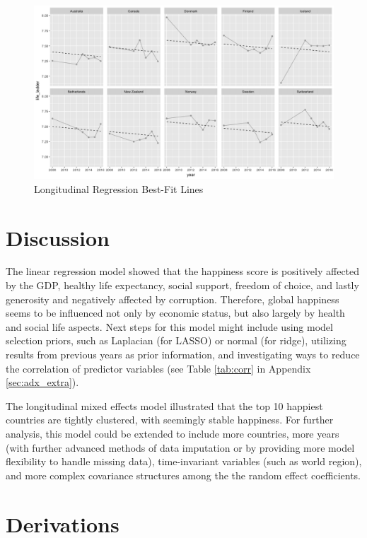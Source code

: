 \documentclass{article}
\begin{document}
\begin{figure}[h!]
\centering
\includegraphics[scale=.45]{each_long_fit.png}
\caption{\label{fig:each_long}Longitudinal Regression Best-Fit Lines}
\end{figure}

\section{Discussion} \label{sec:discussion}
The linear regression model showed that the happiness score is positively affected by the GDP, healthy life expectancy, social support, freedom of choice, and lastly generosity and negatively affected by corruption. Therefore, global happiness seems to be influenced not only by economic status, but also largely by health and social life aspects. Next steps for this model might include using model selection priors, such as Laplacian (for LASSO) or normal (for ridge), utilizing results from previous years as prior information, and investigating ways to reduce the correlation of predictor variables (see Table \ref{tab:corr} in Appendix \ref{sec:adx_extra}).

The longitudinal mixed effects model illustrated that the top 10 happiest countries are tightly clustered, with seemingly stable happiness. For further analysis, this model could be extended to include more countries, more years (with further advanced methods of data imputation or by providing more model flexibility to handle missing data), time-invariant variables (such as world region), and more complex covariance structures among the the random effect coefficients.




\appendix

\section{Derivations} \label{sec:adx_derivations}
\end{document}
